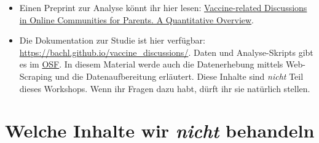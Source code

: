 \documentclass[
]{book}
\providecommand{\tightlist}{%
  \setlength{\itemsep}{0pt}\setlength{\parskip}{0pt}}
\begin{document}
\begin{itemize}
  \begin{itemize}
  \tightlist
  \item
    Einen Preprint zur Analyse könnt ihr hier lesen: \href{https://osf.io/ad9h7/}{Vaccine-related Discussions in Online Communities for Parents. A Quantitative Overview}.
  \item
    Die Dokumentation zur Studie ist hier verfügbar: \url{https://bachl.github.io/vaccine_discussions/}. Daten und Analyse-Skripts gibt es im \href{https://osf.io/twx38/}{OSF}. In diesem Material werde auch die Datenerhebung mittels Web-Scraping und die Datenaufbereitung erläutert. Diese Inhalte sind \emph{nicht} Teil dieses Workshops. Wenn ihr Fragen dazu habt, dürft ihr sie natürlich stellen.
  \end{itemize}
\end{itemize}

\hypertarget{welche-inhalte-wir-nicht-behandeln}{%
\section{\texorpdfstring{Welche Inhalte wir \emph{nicht} behandeln}{Welche Inhalte wir nicht behandeln}}\label{welche-inhalte-wir-nicht-behandeln}}
\end{document}
